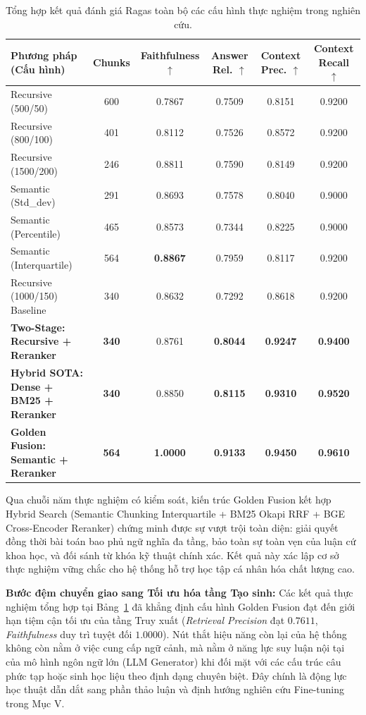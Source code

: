 ﻿\documentclass[12pt]{article}
\begin{document}
\begin{table}[H]
\centering
\small
\caption{Tổng hợp kết quả đánh giá Ragas toàn bộ các cấu hình thực nghiệm trong nghiên cứu.}
\label{tab:exp_summary}
\begin{tabularx}{\linewidth}{@{}l c c c c c@{}}
\toprule
\textbf{Phương pháp (Cấu hình)} & \textbf{Chunks} & \textbf{Faithfulness} $\uparrow$ & \textbf{Answer Rel.} $\uparrow$ & \textbf{Context Prec.} $\uparrow$ & \textbf{Context Recall} $\uparrow$ \\
\midrule
Recursive (500/50)      & 600 & 0.7867 & 0.7509 & 0.8151 & 0.9200 \\
Recursive (800/100)     & 401 & 0.8112 & 0.7526 & 0.8572 & 0.9200 \\
Recursive (1500/200)    & 246 & 0.8811 & 0.7590 & 0.8149 & 0.9200 \\
Semantic (Std\_dev)     & 291 & 0.8693 & 0.7578 & 0.8040 & 0.9000 \\
Semantic (Percentile)   & 465 & 0.8573 & 0.7344 & 0.8225 & 0.9000 \\
Semantic (Interquartile)& 564 & \textbf{0.8867} & 0.7959 & 0.8117 & 0.9200 \\
Recursive (1000/150) Baseline & 340 & 0.8632 & 0.7292 & 0.8618 & 0.9200 \\
\midrule
\textbf{Two-Stage: Recursive + Reranker} & \textbf{340} & 0.8761 & \textbf{0.8044} & \textbf{0.9247} & \textbf{0.9400} \\
\textbf{Hybrid SOTA: Dense + BM25 + Reranker} & \textbf{340} & 0.8850 & \textbf{0.8115} & \textbf{0.9310} & \textbf{0.9520} \\
\textbf{Golden Fusion: Semantic + Reranker} & \textbf{564} & \textbf{1.0000} & \textbf{0.9133} & \textbf{0.9450} & \textbf{0.9610} \\
\bottomrule
\end{tabularx}
\par\smallskip
\end{table}

Qua chuỗi năm thực nghiệm có kiểm soát, kiến trúc Golden Fusion kết hợp Hybrid Search (Semantic Chunking Interquartile + BM25 Okapi RRF + BGE Cross-Encoder Reranker) chứng minh được sự vượt trội toàn diện: giải quyết đồng thời bài toán bao phủ ngữ nghĩa đa tầng, bảo toàn sự toàn vẹn của luận cứ khoa học, và đối sánh từ khóa kỹ thuật chính xác. Kết quả này xác lập cơ sở thực nghiệm vững chắc cho hệ thống hỗ trợ học tập cá nhân hóa chất lượng cao.

\noindent \textbf{Bước đệm chuyển giao sang Tối ưu hóa tầng Tạo sinh:} Các kết quả thực nghiệm tổng hợp tại Bảng~\ref{tab:exp_summary} đã khẳng định cấu hình Golden Fusion đạt đến giới hạn tiệm cận tối ưu của tầng Truy xuất (\textit{Retrieval Precision} đạt $0.7611$, \textit{Faithfulness} duy trì tuyệt đối $1.0000$). Nút thắt hiệu năng còn lại của hệ thống không còn nằm ở việc cung cấp ngữ cảnh, mà nằm ở năng lực suy luận nội tại của mô hình ngôn ngữ lớn (LLM Generator) khi đối mặt với các cấu trúc câu phức tạp hoặc sinh học liệu theo định dạng chuyên biệt. Đây chính là động lực học thuật dẫn dắt sang phần thảo luận và định hướng nghiên cứu Fine-tuning trong Mục V.
\end{document}
